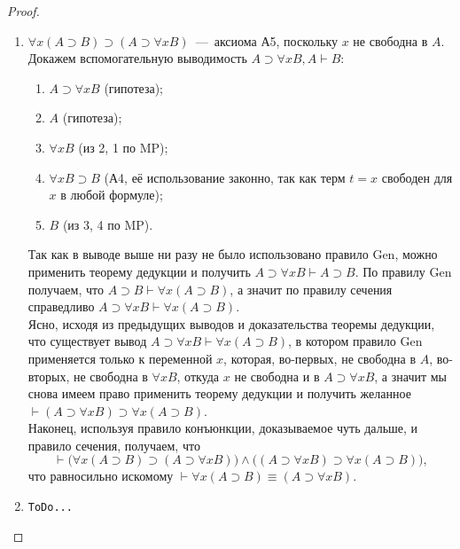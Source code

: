 \begin{proof}
\begin{enumerate}[label=\arabic*)]
        \item $\forall x(A \supset B) \supset (A \supset \forall xB)$~---~аксиома А5, поскольку $x$ не свободна в $A$. Докажем вспомогательную выводимость $A \supset \forall xB, A \vdash B$: 
        \begin{enumerate}[label=\arabic*.]
            \item $A \supset \forall xB$ (гипотеза);
            \item $A$ (гипотеза);
            \item $\forall xB$ (из 2, 1 по MP);
            \item $\forall xB \supset B$ (А4, её использование законно, так как терм $t = x$ свободен для $x$ в любой формуле);
            \item $B$ (из 3, 4 по MP).
        \end{enumerate}
        Так как в выводе выше ни разу не было использовано правило Gen, можно применить теорему дедукции и получить $A \supset \forall xB \vdash A \supset B$. По правилу Gen получаем, что $A \supset B \vdash \forall x(A \supset B)$, а значит по правилу сечения справедливо $A \supset \forall xB \vdash \forall x(A \supset B)$. \\
        Ясно, исходя из предыдущих выводов и доказательства теоремы дедукции, что существует вывод $A \supset \forall xB \vdash \forall x(A \supset B)$, в котором правило Gen применяется только к переменной $x$, которая, во-первых, не свободна в $A$, во-вторых, не свободна в $\forall xB$, откуда $x$ не свободна и в $A \supset \forall xB$, а значит мы снова имеем право применить теорему дедукции и получить желанное $\vdash (A \supset \forall xB) \supset \forall x(A \supset B)$. \\
        Наконец, используя правило конъюнкции, доказываемое чуть дальше, и правило сечения, получаем, что
        \[
            \vdash \big(\forall x(A \supset B) \supset (A \supset \forall xB)\big) \land \big((A \supset \forall xB) \supset \forall x(A \supset B)\big),
        \]
        что равносильно искомому $\vdash \forall x(A \supset B) \equiv (A \supset \forall xB)$.

        \item \texttt{ToDo...}
    \end{enumerate}
\end{proof}

